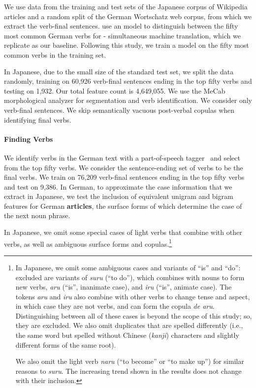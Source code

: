 We use data from the training and test sets of the  Japanese
corpus of Wikipedia articles and a random split of the German
Wortschatz web corpus, from which we extract the verb-final
sentences.  use an \ngram{} model to distinguish
between the fifty most common German verbs for -
simultaneous machine translation, which we replicate as our baseline.
Following this study, we train a model on the fifty most common verbs
in the training set.

In Japanese, due to the small size of the standard test set, we
split the data randomly, training on 60,926 verb-final
sentences ending in the top fifty verbs and testing on 1,932.  Our total
feature count is 4,649,055.  We use the MeCab~\cite{kudo2005mecab}
morphological analyzer for segmentation and verb identification.  We
consider only verb-final sentences. We skip semantically vacuous
post-verbal copulas when identifying final verbs.

\paragraph{Finding Verbs}

We identify verbs in the German text with a part-of-speech
tagger~\cite{toutanova2003feature} and select from the top fifty
verbs.  We consider the sentence-ending set of verbs to be the final
verbs. We train on 76,209 verb-final sentences ending in the top fifty
verbs and test on 9,386.  In German, to approximate the case
information that we extract in Japanese, we test the inclusion of
equivalent unigram and bigram features for German \textbf{articles},
the surface forms of which determine the case of the next noun phrase.

In Japanese, we omit some special cases of light verbs that combine
with other verbs, as well as ambiguous surface forms and
copulas.\footnote{In Japanese, we omit some ambiguous cases and
  variants of ``is'' and ``do'': excluded are variants of
  \textit{suru} (``to do''), which combines with nouns to form new
  verbs, \textit{aru} (``is'', inanimate case), and \textit{iru}
  (``is'', animate case). The tokens \textit{aru} and \textit{iru}
  also combine with other verbs to change tense and aspect, in which
  case they are not verbs, and can form the copula \textit{de aru}.
  Distinguishing between all of these cases is beyond the scope of
  this study; so, they are excluded.  We also omit duplicates that are
  spelled differently (i.e., the same word but spelled without Chinese
  (\textit{kanji}) characters and slightly different forms of the same
  root).

  We also omit the light verb \textit{naru} (``to become'' or ``to
  make up'') for similar reasons to \textit{suru}.  The increasing
  trend shown in the results does not change with their inclusion.}

